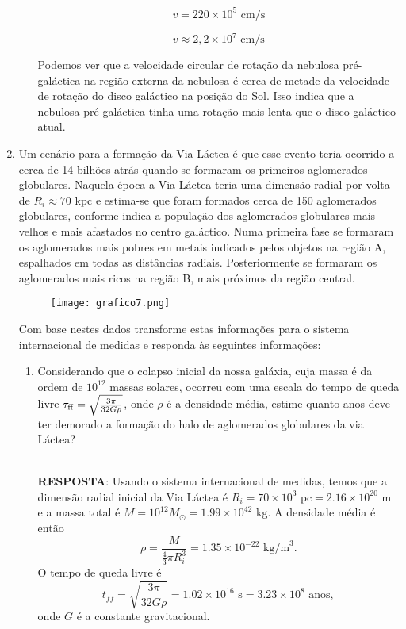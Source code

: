 \documentclass[a4paper,12pt]{article}
\begin{document}
\begin{enumerate}
\begin{enumerate}
$$v = 220 \times 10^5 \text{ cm/s}$$

$$v \approx 2,2 \times 10^7 \text{ cm/s}$$

Podemos ver que a velocidade circular de rotação da nebulosa pré-galáctica na região externa da nebulosa é cerca de metade da velocidade de rotação do disco galáctico na posição do Sol. Isso indica que a nebulosa pré-galáctica tinha uma rotação mais lenta que o disco galáctico atual.

\end{enumerate}

\noindent\hrulefill

\item Um cenário para a formação da Via Láctea é que esse evento teria ocorrido a cerca de 14 bilhões atrás quando se formaram os primeiros aglomerados globulares. Naquela época a Via Láctea teria uma dimensão radial por volta de $R_i\approx 70$ kpc e estima-se que foram formados cerca de 150 aglomerados globulares, conforme indica a população dos aglomerados globulares mais velhos e mais afastados no centro galáctico. Numa primeira fase se formaram os aglomerados mais pobres em metais indicados pelos objetos na região A, espalhados em todas as distâncias radiais. Posteriormente se formaram os aglomerados mais ricos na região B, mais próximos da região central.

\begin{figure}[H]
    \centering
    \texttt{[image: grafico7.png]}
\end{figure}

Com base nestes dados transforme estas informações para o sistema internacional de medidas e responda às seguintes informações:
\begin{enumerate}
\item Considerando que o colapso inicial da nossa galáxia, cuja massa é da ordem de $10^{12}$ massas solares, ocorreu com uma escala do tempo de queda livre $\tau_{\rm ff} = \sqrt{\frac{3\pi}{32 G \rho}}$, onde $\rho$ é a densidade média, estime quanto anos deve ter demorado a formação do halo de aglomerados globulares da via Láctea?

\noindent\hrulefill\\\textbf{RESPOSTA}: Usando o sistema internacional de medidas, temos que a dimensão radial inicial da Via Láctea é $R_i = 70 \times 10^3 \text{ pc} = 2.16 \times 10^{20} \text{ m}$ e a massa total é $M = 10^{12} M_\odot = 1.99 \times 10^{42} \text{ kg}$. A densidade média é então $$\rho = \frac{M}{\frac{4}{3}\pi R_i^3} = 1.35 \times 10^{-22} \text{ kg/m}^3.$$ O tempo de queda livre é $$t_{ff} = \sqrt{\frac{3\pi}{32G\rho}} = 1.02 \times 10^{16} \text{ s} = 3.23 \times 10^8 \text{ anos},$$ onde $G$ é a constante gravitacional.


\end{enumerate}
\end{enumerate}
\end{document}
